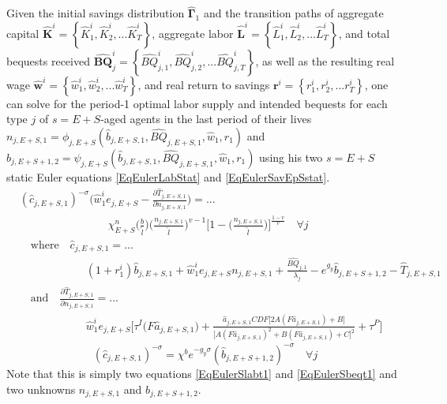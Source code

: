   Given the initial savings distribution $\bm{\hat{\Gamma}}_1$ and the transition paths of aggregate capital $\bm{\hat{K}}^i = \left\{\hat{K}_1^i,\hat{K}_2^i,...\hat{K}_T^i\right\}$, aggregate labor $\bm{\hat{L}}^i = \left\{\hat{L}_1^i,\hat{L}_2^i,...\hat{L}_T^i\right\}$, and total bequests received $\bm{\hat{BQ}}_j^i = \left\{\hat{BQ}_{j,1}^i,\hat{BQ}_{j,2}^i,...\hat{BQ}_{j,T}^i\right\}$, as well as the resulting real wage $\bm{\hat{w}}^i = \left\{\hat{w}_1^i,\hat{w}_2^i,...\hat{w}_T^i\right\}$, and real return to savings $\bm{r}^i = \left\{r_1^i,r_2^i,...r_T^i\right\}$, one can solve for the period-1 optimal labor supply and intended bequests for each type $j$ of $s=E+S$-aged agents in the last period of their lives $n_{j,E+S,1}=\phi_{j,E+S}(\hat{b}_{j,E+S,1},\hat{BQ}_{j,E+S,1},\hat{w}_1,r_1)$ and $\hat{b}_{j,E+S+1,2}=\psi_{j,E+S}(\hat{b}_{j,E+S,1},\hat{BQ}_{j,E+S,1},\hat{w}_1,r_1)$ using his two $s=E+S$ static Euler equations \eqref{EqEulerLabStat} and \eqref{EqEulerSavEpSstat}.
  \begin{equation}\label{EqEulerSlabt1}
    \begin{split}
      &(\hat{c}_{j,E+S,1})^{-\sigma}\Biggl(\hat{w}_1^i e_{j,E+S} - \frac{\partial\hat{T}_{j,E+S,1}}{\partial n_{j,E+S,1}}\Biggr) = ... \\
      &\qquad\qquad\qquad\qquad \chi^n_{E+S}\biggl(\frac{b}{\tilde{l}}\biggr)\biggl(\frac{n_{j,E+S,1}}{\tilde{l}}\biggr)^{v-1}\Biggl[1 - \biggl(\frac{n_{j,E+S,1}}{\tilde{l}}\biggr)\Biggr]^{\frac{1-v}{v}} \quad\forall j \\
      &\quad\text{where}\quad \hat{c}_{j,E+S,1} = ... \\
      &\qquad\qquad\qquad \left(1 + r_1^i\right)\hat{b}_{j,E+S,1} + \hat{w}_1^i e_{j,E+S}n_{j,E+S,1} + \frac{\hat{BQ}_{j,1}}{\lambda_j} - e^{g_y}\hat{b}_{j,E+S+1,2} - \hat{T}_{j,E+S,1} \\
      &\quad\text{and}\quad \frac{\partial \hat{T}_{j,E+S,1}}{\partial n_{j,E+S,1}} = ... \\
      &\qquad\qquad\qquad \hat{w}_1^i e_{j,E+S}\biggl[\tau^I\bigl(F\hat{a}_{j,E+S,1}\bigr) + \frac{\hat{a}_{j,E+S,1}CDF\bigl[2A(F\hat{a}_{j,E+S,1})+B\bigr]}{\bigl[A(F\hat{a}_{j,E+S,1})^2+B(F \hat{a}_{j,E+S,1})+C\bigr]^2} + \tau^P\Biggr]
    \end{split}
  \end{equation}
  \begin{equation}\label{EqEulerSbeqt1}
    (\hat{c}_{j,E+S,1})^{-\sigma} = \chi^b e^{-g_y\sigma}(\hat{b}_{j,E+S+1,2})^{-\sigma} \quad\forall j
  \end{equation}
  Note that this is simply two equations \eqref{EqEulerSlabt1} and \eqref{EqEulerSbeqt1} and two unknowns $n_{j,E+S,1}$ and $\hat{b}_{j,E+S+1,2}$.


